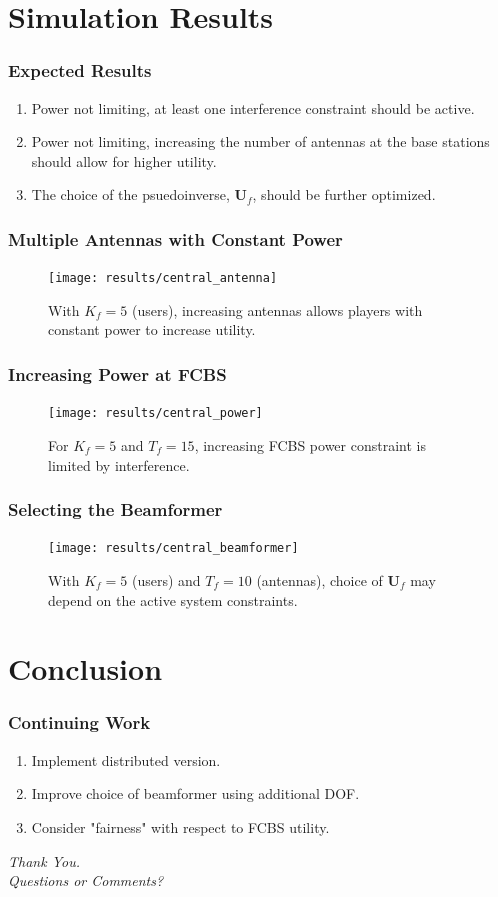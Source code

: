 \documentclass[10pt,tgadventor, onlymath]{beamer}
\begin{document}
\section{Simulation Results}

\begin{frame}
\frametitle{Expected Results}
\begin{enumerate}
\setlength\itemsep{2em}

\item
	Power not limiting, at least one interference constraint should be active.
\item
	Power not limiting, increasing the number of antennas at the base stations should allow for higher utility.
\item
	The choice of the psuedoinverse, $\mathbf{U}_{f}$, should be further optimized. 
\end{enumerate}
\end{frame}


\begin{frame}
\frametitle{Multiple Antennas with Constant Power}
\begin{figure}
	\texttt{[image: results/central\_antenna]}
	\caption{With $K_f = 5$ (users), increasing antennas allows players with constant power to increase utility.}
\end{figure}
\end{frame}

\begin{frame}
\frametitle{Increasing Power at FCBS}
\begin{figure}
	\texttt{[image: results/central\_power]}
	\caption{For $K_f = 5$ and $T_f = 15$, increasing FCBS power constraint is limited by interference.}
\end{figure}
\end{frame}

\begin{frame}
\frametitle{Selecting the Beamformer}
\begin{figure}
	\texttt{[image: results/central\_beamformer]}
\caption{With $K_f = 5$ (users) and $T_f = 10$ (antennas), choice of $\mathbf{U}_{f}$ may depend on the active system constraints.}
\end{figure}
\end{frame}

\section{Conclusion}
\begin{frame}
\frametitle{Continuing Work}
\begin{enumerate}
\item
	Implement distributed version.
\item
	Improve choice of beamformer using additional DOF. 
\item
	Consider "fairness" with respect to FCBS utility.
\end{enumerate}
\end{frame}

\begin{frame}
  \centering \Large
  \emph{Thank You.}
  \\
	\bigskip
    \centering \Large
  \emph{Questions or Comments?}
\end{frame}
\end{document}
